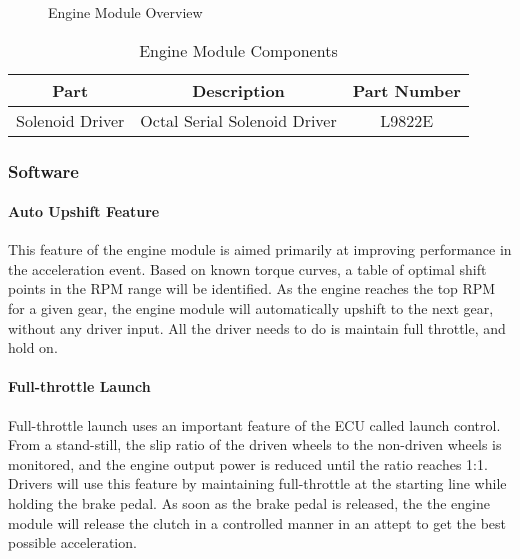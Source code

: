   \begin{figure}[H]
    \begin{centering}
      
    \end{centering}

    \caption{Engine Module Overview\label{fig:Engine-Module-Overview}}
  \end{figure}

  \begin{centering}
  \begin{table}[H]
    \caption{Engine Module Components\label{tab:Engine-Module}}
      \begin{tabular}{|c|c|c|}
	\hline 
	Part & Description & Part Number\tabularnewline
	\hline
	\hline
	Solenoid Driver & Octal Serial Solenoid Driver & L9822E\tabularnewline
	\hline
      \end{tabular}
  \end{table}
  \end{centering}


\subsubsection{Software}

\paragraph{Auto Upshift Feature}
This feature of the engine module is aimed primarily at improving performance in the acceleration event. Based on known torque curves, a table of optimal shift points in the RPM range will be identified. As the engine reaches the top RPM for a given gear, the engine module will automatically upshift to the next gear, without any driver input. All the driver needs to do is maintain full throttle, and hold on.

\paragraph{Full-throttle Launch}
Full-throttle launch uses an important feature of the ECU called launch control. From a stand-still, the slip ratio of the driven wheels to the non-driven wheels is monitored, and the engine output power is reduced until the ratio reaches 1:1. Drivers will use this feature by maintaining full-throttle at the starting line while holding the brake pedal. As soon as the brake pedal is released, the the engine module will release the clutch in a controlled manner in an attept to get the best possible acceleration.

